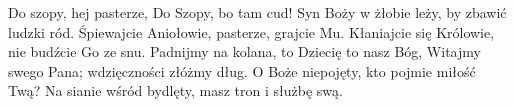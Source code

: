 \beginverse
Do szopy, hej pasterze,
Do Szopy, bo tam cud!
Syn Boży w żłobie leży,
by zbawić ludzki ród.
\endverse
\beginchorus
Śpiewajcie Aniołowie,
pasterze, grajcie Mu.
Kłaniajcie się Królowie,
nie budźcie Go ze snu.
\endchorus
\beginverse
Padnijmy na kolana,
to Dziecię to nasz Bóg,
Witajmy swego Pana;
wdzięczności złóżmy dług.
\endverse
\beginverse
O Boże niepojęty, kto
pojmie miłość Twą?
Na sianie wśród bydlęty,
masz tron i służbę swą.
\endverse
\endsong